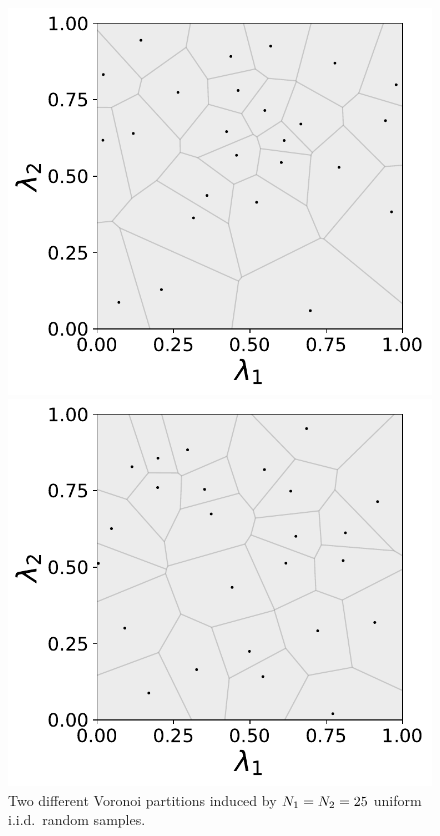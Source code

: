 \begin{figure}[ht]
\centering
	\begin{minipage}{.4875\textwidth}
		\includegraphics[width=\linewidth]{./images/voronoi_diagrams/voronoi_diagram_N25_r0}
	\end{minipage}
	\begin{minipage}{.4875\textwidth}
		\includegraphics[width=\linewidth]{./images/voronoi_diagrams/voronoi_diagram_N25_r10}
	\end{minipage}
\caption{
Two different Voronoi partitions induced by $N_1 = N_2 = 25 $ uniform i.i.d.~random samples.
}
\label{fig:voronoi_issues}
\end{figure}


